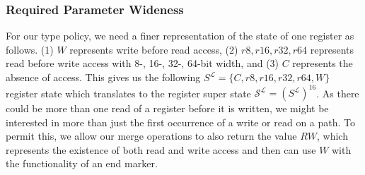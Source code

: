 \subsubsection{Required Parameter Wideness}
\label{subsection:requiredparamwideness}
For our type policy, we need a finer representation of the state of one register as follows.
(1) $W$ represents write before read access,
(2) $r8, r16, r32, r64$ represents read before write access with 8-, 16-, 32-, 64-bit width, and
(3) $C$ represents the absence of access.
This gives us the following $S^\mathcal{L} = \{ C, r8, r16, r32, r64, W \}$ register state which translates to the register super state 
$\mathcal{S}^\mathcal{L} = (S^\mathcal{L})^{16}$.
As there could be more than one read of a register before it is written, we might be interested in more than just the first occurrence of a write or read on a path. 
To permit this, we allow our merge operations to also return the value $RW$, which represents the existence of both read and write access and then can use $W$ with the functionality of an end marker.

